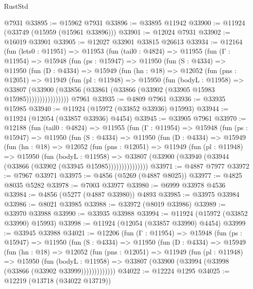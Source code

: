 \begin{lexlean}{RustStd}
\begin{coremodule}
{\begin{coremodule}
{{{{{{{{{{{{{{{{{{{{{{{{{{{{{{{{{{{{{{{{{{{{{{{{{{{{{{{{{{{{{{{{{{{{{{{{{{{{{{{{    @7931
@33895 := @15962 @7931
@33896 := @33895 @11942
@33900 := @11924 (@33749 (@15959 (@15961 @33896)))
@33901 := @12024 @7931
@33902 := @16019 @33901
@33905 := @12027 @33901 @33815 @26613
@33934 := @12164
    (fun (lets0 : @11951) =>
    @11953
      (fun (tail0 : @4824) =>
      @11955
        (fun (Γ : @11954) =>
        @15948
          (fun (ps : @15947) =>
          @11950
            (fun (S : @4334) =>
            @11950
              (fun (D : @4334) =>
              @15949
                (fun (hn : @18) =>
                @12052
                  (fun (pns : @12051) =>
                  @11949
                    (fun (pl : @11948) =>
                    @15950
                      (fun (bodyL : @11958) =>
                      @33807
                        (@33900
                          (@33856 (@33861 (@33866 (@33902 (@33905 @15983 @15985))))))))))))))))
    @7961
@33935 := @4809 @7961
@33936 := @33935 @15985
@33940 := @11924 (@15972 (@33852 @33936) @15993)
@33944 := @11924 (@12054 (@33857 @33936) @4454)
@33945 := @33905 @7961
@33970 := @12188
    (fun (tail0 : @4824) =>
    @11955
      (fun (Γ : @11954) =>
      @15948
        (fun (ps : @15947) =>
        @11950
          (fun (S : @4334) =>
          @11950
            (fun (D : @4334) =>
            @15949
              (fun (hn : @18) =>
              @12052
                (fun (pns : @12051) =>
                @11949
                  (fun (pl : @11948) =>
                  @15950
                    (fun (bodyL : @11958) =>
                    @33807 (@33900 (@33940 (@33944 (@33866 (@33902 (@33945 @15985)))))))))))))))
@33971 := @4887 @7977
@33972 := @7967 @33971
@33975 := @4856 (@5269 (@4887 @8025))
@33977 := @4825 @8035 @5282
@33978 := @7003 @33977
@33980 := @6999 @33978 @4536
@33984 := @4856 (@5277 (@4887 @33980)) @4893
@33985 := @33975 @33984
@33986 := @8021 @33985
@33988 := @33972 (@8019 @33986)
@33989 := @33970 @33988
@33990 := @33935 @33988
@33994 := @11924 (@15972 (@33852 @33990) @15993)
@33998 := @11924 (@12054 (@33857 @33990) @4454)
@33999 := @33945 @33988
@34021 := @12206
    (fun (Γ : @11954) =>
    @15948
      (fun (ps : @15947) =>
      @11950
        (fun (S : @4334) =>
        @11950
          (fun (D : @4334) =>
          @15949
            (fun (hn : @18) =>
            @12052
              (fun (pns : @12051) =>
              @11949
                (fun (pl : @11948) =>
                @15950
                  (fun (bodyL : @11958) =>
                  @33807 (@33900 (@33994 (@33998 (@33866 (@33902 @33999)))))))))))))
@34022 := @12224 @1295
@34025 := @12219 (@13718 (@34022 @13719))
}}}}}}}}}}}}}}}}}}}}}}}}}}}}}}}}}}}}}}}}}}}}}}}}}}}}}}}}}}}}}}}}}}}}}}}}}}}}}}}}
\end{coremodule}}
\end{coremodule}
\end{lexlean}
